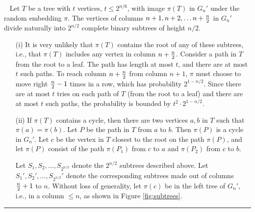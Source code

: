 \documentclass[aps,11pt,twoside,nofootinbib,tightenlines,superscriptaddress,preprintnumbers]{revtex4}
\newcommand{\<}{\langle}
\renewcommand{\>}{\rangle}
\newcommand{\qed}{\rule{7pt}{7pt}}
\newenvironment{proof}
  {\trivlist\item\noindent{\bf Proof}~}
  {\qed\endtrivlist}
\begin{document}
\begin{proof}
Let $T$ be a tree with $t$ vertices, $t \le 2^{n/6}$, with image $\pi(T)$
in $G_n'$ under the random embedding $\pi$.  The vertices of columns $n+1, n+2,
\ldots n+{n \over 2}$ in $G_n'$ divide naturally into $2^{n/2}$ complete
binary subtrees of height $n/2$.

\begin{enumerate}
\item[(i)]
It is very unlikely that $\pi(T)$ contains the root of any of these
subtrees, i.e., that $\pi(T)$ includes any vertex in column $n+{n \over
2}$.  Consider a path in $T$ from the root to a leaf.  The path has length
at most $t$, and there are at most $t$ such paths.  To reach column $n+{n
\over 2}$ from column $n+1$, $\pi$ must choose to move right ${n \over
2}-1$ times in a row, which has probability $2^{1-n/2}$.  Since there are
at most $t$ tries on each path of $T$ (from the {\sc root} to a leaf)
and there are at most $t$ such paths, the probability is bounded by
$t^2 \cdot 2^{1-n/2}$.

\item[(ii)]
If $\pi(T)$ contains a cycle, then there are two vertices $a,b$ in $T$
such that $\pi(a)=\pi(b)$.  Let $P$ be the path in $T$ from $a$ to $b$.
Then $\pi(P)$ is a cycle in $G_n'$.  Let $c$ be the vertex in $T$ closest
to the root on the path $\pi(P)$, and let $\pi(P)$ consist of the path
$\pi(P_1)$ from $c$ to $a$ and $\pi(P_2)$ from $c$ to $b$.

Let $S_1,S_2,\ldots,S_{2^{n/2}}$ denote the $2^{n/2}$ subtrees described
above.  Let $S_1',S_2',\ldots,S_{2^{n/2}}'$ denote the corresponding
subtrees made out of columns ${n \over 2}+1$ to $n$.  Without loss of
generality, let $\pi(c)$ be in the left tree of $G_n'$, i.e., in a column
$\le n$, as shown in Figure \ref{fig:subtrees}.


\end{enumerate}
\end{proof}
\end{document}
